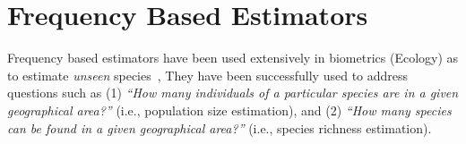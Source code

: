 \documentclass[sigconf,review,anonymous]{acmart}
\newcounter{todocounter}
\newcommand{\todo}[1]{\marginpar{$|$}\textcolor{red}{\stepcounter{todocounter}\footnote[\thetodocounter]{\textcolor{red}{\textbf{TODO }}\textit{#1}}}}
\newcommand{\Evosuite}{\textsc{EvoSuite}\xspace}
\newcommand{\original}{\textsc{Original}\xspace}
\newcommand{\EvosuiteRandom}{\textsc{Random}\xspace}
\newcommand{\EvosuiteDynamosa}{\textsc{DynaMOSA}\xspace}
\renewcommand{\todo}[1]{}
\begin{document}


\section{Frequency Based Estimators}
\label{sec:estimators}
Frequency based estimators have been used extensively in biometrics (Ecology) as
to estimate \emph{unseen} species~\cite{chao2016species},
They have been successfully used to address questions such as
(1) \emph{``How many individuals of a particular species are in a given geographical area?''} (i.e., population size estimation),
and 
(2) \emph{``How many species can be found in a given geographical area?''} (i.e., species richness estimation).
\end{document}
